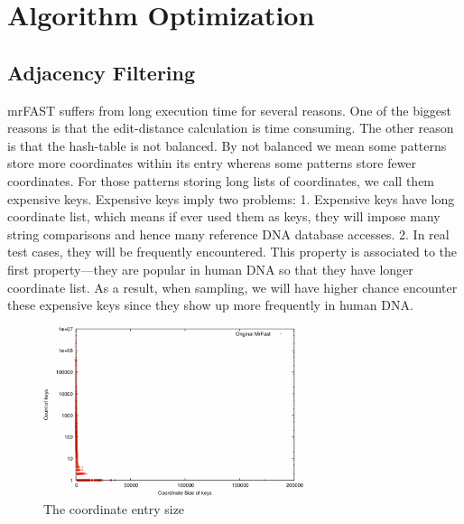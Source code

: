 \section{Algorithm Optimization} \label{sec:algorithm}

\subsection{Adjacency Filtering} \label{sec:af} 

mrFAST suffers from long execution time for several reasons. One of the biggest
reasons is that the edit-distance calculation is time consuming. The other
reason is that the hash-table is not balanced. By not balanced we mean some
patterns store more coordinates within its entry whereas some patterns store
fewer coordinates. For those patterns storing long lists of coordinates, we
call them expensive keys.  Expensive keys imply two problems: 1. Expensive keys
have long coordinate list, which means if ever used them as keys, they will
impose many string comparisons and hence many reference DNA database accesses.
2. In real test cases, they will be frequently encountered. This property is
associated to the first property—they are popular in human DNA so that they
have longer coordinate list. As a result, when sampling, we will have higher
chance encounter these expensive keys since they show up more frequently in
human DNA. \\
 
\begin{figure}[t] 
\centering
\vspace{0.1in}
\includegraphics[width=3in]{./figure/Entry_Size_B.pdf} \vspace{0in}
\caption{The coordinate entry size}
\label{fig:entry_size} 
\end{figure}

